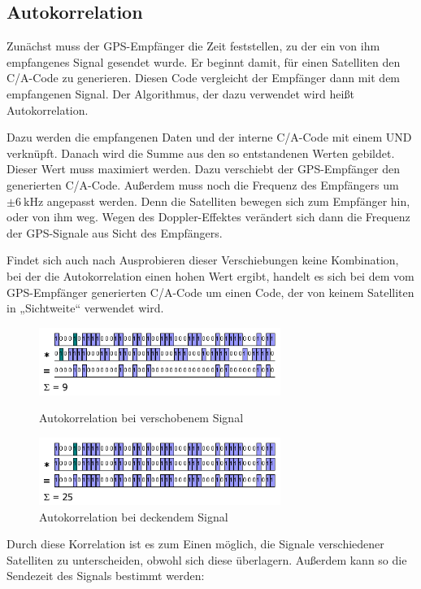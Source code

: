 \documentclass[12pt,a4paper]{scrartcl}
\begin{document}
\subsection{Autokorrelation}
Zunächst muss der GPS-Empfänger die Zeit feststellen, zu der ein von ihm empfangenes Signal gesendet wurde. Er beginnt damit, für einen Satelliten den C/A-Code zu generieren. Diesen Code vergleicht der Empfänger dann mit dem empfangenen Signal. Der Algorithmus, der dazu verwendet wird heißt Autokorrelation.

Dazu werden die empfangenen Daten und der interne C/A-Code mit einem UND verknüpft. Danach wird die Summe aus den so entstandenen Werten gebildet. Dieser Wert muss maximiert werden. Dazu verschiebt der GPS-Empfänger den generierten C/A-Code. Außerdem muss noch die Frequenz des Empfängers um $\pm \SI{6}{\kilo\hertz}$ angepasst werden. Denn die Satelliten bewegen sich zum Empfänger hin, oder von ihm weg. Wegen des Doppler-Effektes verändert sich dann die Frequenz der GPS-Signale aus Sicht des Empfängers.

Findet sich auch nach Ausprobieren dieser Verschiebungen keine Kombination, bei der die Autokorrelation einen hohen Wert ergibt, handelt es sich bei dem vom GPS-Empfänger generierten C/A-Code um einen Code, der von keinem Satelliten in „Sichtweite“ verwendet wird.

\begin{figure}[H]
\centering
\includegraphics[width=0.7\textwidth]{img/ac_9.png}
\caption{Autokorrelation bei verschobenem Signal\cite{kowoma_signalv}}
\includegraphics[width=0.7\textwidth]{img/ac_25.png}
\caption{Autokorrelation bei deckendem Signal\cite{kowoma_signalv}}
\label{fig:ac}
\end{figure}

Durch diese Korrelation ist es zum Einen möglich, die Signale verschiedener Satelliten zu unterscheiden, obwohl sich diese überlagern. Außerdem kann so die Sendezeit des Signals bestimmt werden:
\end{document}

